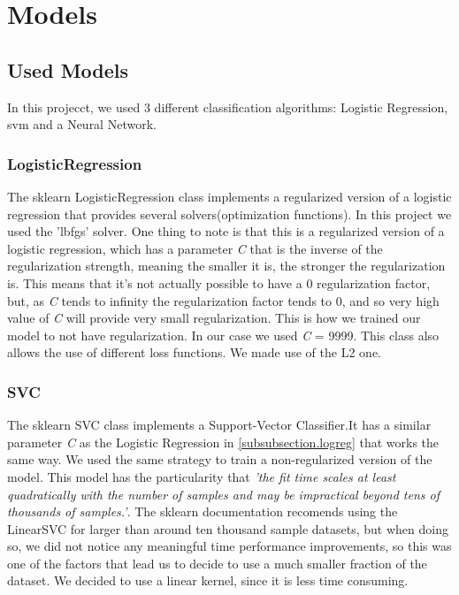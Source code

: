 \documentclass[12pt]{article}
\begin{document}
\section{Models}
\label{section.models}

\subsection{Used Models}
\label{subsection.used_models}
In this projecct, we used 3 different classification algorithms: Logistic Regression, \ac{svm} and a Neural Network.
\subsubsection{LogisticRegression}
\label{subsubsection.logreg}
    \par 
        The sklearn LogisticRegression\cite{logisticRegression} class implements a regularized version of a logistic regression that 
        provides several solvers(optimization functions). In this project we used the 'lbfgs' solver. One thing to note is that 
        this is a regularized version of a logistic regression, which has a parameter \textit{C} that is the inverse of the 
        regularization strength, meaning the smaller it is, the stronger the regularization is. This means that it's not actually 
        possible to have a 0 regularization factor, but, as \textit{C} tends to infinity the regularization factor tends to 0, and 
        so very high value of \textit{C} will provide very small regularization. This is how we trained our model to not have regularization. 
        In our case we used \textit{C} = 9999. This class also allows the use of different loss functions. We made use of the L2\cite{loss_functions} one.

\subsubsection{SVC}
\label{subsubsection.svc}
    \par 
        The sklearn SVC\cite{SVC} class implements a Support-Vector Classifier.It has a similar parameter \textit{C} as the Logistic Regression in 
        \autoref{subsubsection.logreg} that works the same way. We used the same strategy to train a non-regularized version of the model. This model has 
        the particularity that \textit{'the fit time scales at least quadratically with the number of samples and may be impractical beyond tens of thousands 
        of samples.'}\cite{SVC}. The sklearn documentation recomends using the LinearSVC\cite{LinearSVC} for larger than around ten thousand sample datasets, 
        but when doing so, we did not notice any meaningful time performance improvements, so this was one of the factors that lead us to decide to use a much 
        smaller fraction of the dataset. We decided to use a linear kernel, since it is less time consuming\cite{kcheck}.
\end{document}
